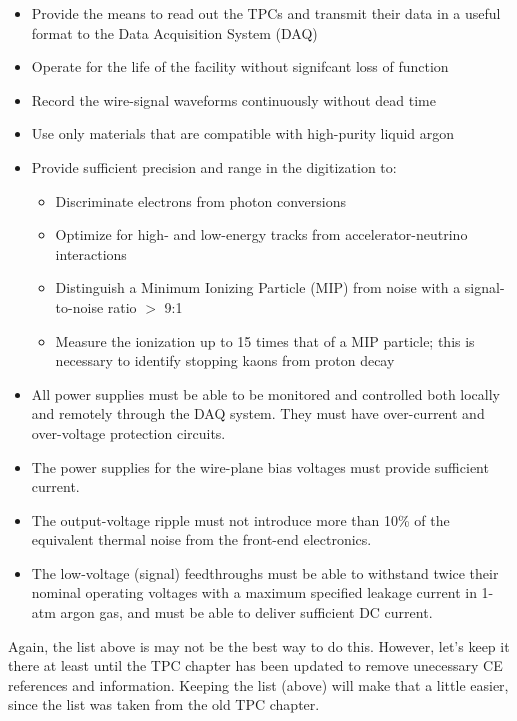 \begin{itemize}	
\item Provide the means to read out the TPCs and transmit their data in a useful format to the Data Acquisition System (DAQ)
\item Operate for the life of the facility without signifcant loss of function
\item Record the wire-signal waveforms continuously without dead time
\item Use only materials that are compatible with high-purity liquid argon
\item Provide sufficient precision and range in the digitization to:
\begin{itemize}
\item Discriminate electrons from photon conversions
\item Optimize for high- and low-energy tracks from accelerator-neutrino interactions
\item Distinguish a Minimum Ionizing Particle (MIP) from noise with a signal-to-noise ratio $>$ 9:1
\item Measure the ionization up to 15 times that of a MIP particle;
this is necessary to identify stopping kaons from proton decay
\end{itemize}
\item All power supplies must be able to be monitored and 
controlled both locally and remotely through the DAQ system.  
They must have over-current and over-voltage protection circuits.
\item The power supplies for the wire-plane bias voltages must provide sufficient current.
\item The output-voltage ripple must not introduce more than 10\% of the equivalent thermal noise from the front-end electronics. 
\item The low-voltage (signal) feedthroughs must be able to withstand twice their nominal operating voltages 
with a maximum specified leakage current in 1-atm argon gas, and must be able to deliver sufficient DC current.
\end{itemize}

\begin{editornote}
  Again, the list above is may not be the best way to do this.
  However, let's keep it there at least until the TPC chapter has been
  updated to remove unecessary CE references and information.
  Keeping the list (above) will make that a little easier, since the list was taken from the old TPC chapter.
\end{editornote}

